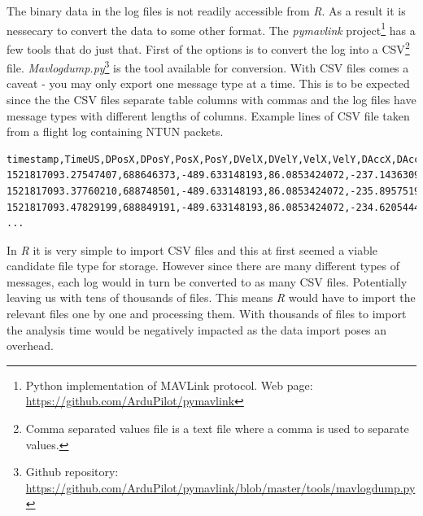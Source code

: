 \documentclass[12pt,oneside]{reedthesis}
\theoremstyle{definition}
\theoremstyle{definition}
\theoremstyle{definition}
\theoremstyle{remark}
\begin{document}
The binary data in the log files is not readily accessible from
\emph{R}. As a result it is nessecary to convert the data to some other
format. The \emph{pymavlink} project\footnote{Python implementation of
  MAVLink protocol. Web page:
  \url{https://github.com/ArduPilot/pymavlink}} has a few tools that do
just that. First of the options is to convert the log into a
CSV\footnote{Comma separated values file is a text file where a comma is
  used to separate values.} file. \emph{Mavlogdump.py}\footnote{Github
  repository:
  \url{https://github.com/ArduPilot/pymavlink/blob/master/tools/mavlogdump.py}}
is the tool available for conversion. With CSV files comes a caveat -
you may only export one message type at a time. This is to be expected
since the the CSV files separate table columns with commas and the log
files have message types with different lengths of columns. Example
lines of CSV file taken from a flight log containing NTUN packets.
\begin{verbatim}
timestamp,TimeUS,DPosX,DPosY,PosX,PosY,DVelX,DVelY,VelX,VelY,DAccX,DAccY
1521817093.27547407,688646373,-489.633148193,86.0853424072,-237.143630981...
1521817093.37760210,688748501,-489.633148193,86.0853424072,-235.895751953...
1521817093.47829199,688849191,-489.633148193,86.0853424072,-234.620544434...
...
\end{verbatim}
In \emph{R} it is very simple to import CSV files and this at first
seemed a viable candidate file type for storage. However since there are
many different types of messages, each log would in turn be converted to
as many CSV files. Potentially leaving us with tens of thousands of
files. This means \emph{R} would have to import the relevant files one
by one and processing them. With thousands of files to import the
analysis time would be negatively impacted as the data import poses an
overhead.
\end{document}
